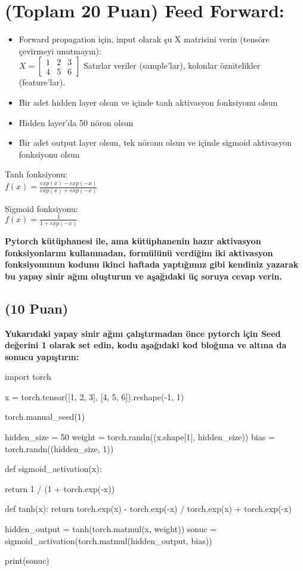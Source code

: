 \documentclass[11pt]{article}
\begin{document}
\section{(Toplam 20 Puan) Feed Forward:}

\begin{itemize}
    \item Forward propagation için, input olarak şu X matrisini verin (tensöre çevirmeyi unutmayın):\\
    $X = \begin{bmatrix}
        1 & 2 & 3\\
        4 & 5 & 6
        \end{bmatrix}$
    Satırlar veriler (sample'lar), kolonlar öznitelikler (feature'lar).
    \item Bir adet hidden layer olsun ve içinde tanh aktivasyon fonksiyonu olsun
    \item Hidden layer'da 50 nöron olsun
    \item Bir adet output layer olsun, tek nöronu olsun ve içinde sigmoid aktivasyon fonksiyonu olsun
\end{itemize}

Tanh fonksiyonu:\\
$f(x) = \frac{exp(x) - exp(-x)}{exp(x) + exp(-x)}$
\vspace{.2in}

Sigmoid fonksiyonu:\\
$f(x) = \frac{1}{1 + exp(-x)}$

\vspace{.2in}
 \textbf{Pytorch kütüphanesi ile, ama kütüphanenin hazır aktivasyon fonksiyonlarını kullanmadan, formülünü verdiğim iki aktivasyon fonksiyonunun kodunu ikinci haftada yaptığımız gibi kendiniz yazarak bu yapay sinir ağını oluşturun ve aşağıdaki üç soruya cevap verin.}

\subsection{(10 Puan)} \textbf{Yukarıdaki yapay sinir ağını çalıştırmadan önce pytorch için Seed değerini 1 olarak set edin, kodu aşağıdaki kod bloğuna ve altına da sonucu yapıştırın:}

\begin{python}
import torch

x = torch.tensor([1, 2, 3], [4, 5, 6]).reshape(-1, 1)

torch.manual_seed(1) 

hidden_size = 50 
weight = torch.randn((x.shape[1], hidden_size))
bias = torch.randn((hidden_size, 1))

def sigmoid_activation(x):

  return 1 / (1 + torch.exp(-x))

def tanh(x):
    return torch.exp(x) - torch.exp(-x) / torch.exp(x) + torch.exp(-x)

hidden_output = tanh(torch.matmul(x, weight))
sonuc = sigmoid_activation(torch.matmul(hidden_output, bias))

print(sonuc)
\end{python}
\end{document}
